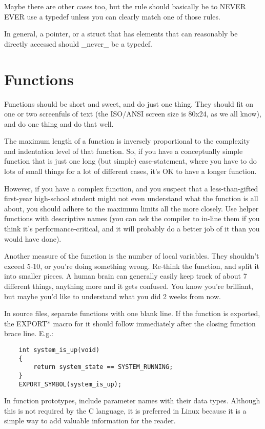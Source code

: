 \documentclass[pdftex,12pt, twocol]{article} %
\begin{document}
Maybe there are other cases too, but the rule should basically be to NEVER
EVER use a typedef unless you can clearly match one of those rules.

In general, a pointer, or a struct that has elements that can reasonably
be directly accessed should \_never\_ be a typedef.


\section{Functions}

Functions should be short and sweet, and do just one thing.  They should
fit on one or two screenfuls of text (the ISO/ANSI screen size is 80x24,
as we all know), and do one thing and do that well.

The maximum length of a function is inversely proportional to the
complexity and indentation level of that function.  So, if you have a
conceptually simple function that is just one long (but simple)
case-statement, where you have to do lots of small things for a lot of
different cases, it's OK to have a longer function.

However, if you have a complex function, and you suspect that a
less-than-gifted first-year high-school student might not even
understand what the function is all about, you should adhere to the
maximum limits all the more closely.  Use helper functions with
descriptive names (you can ask the compiler to in-line them if you think
it's performance-critical, and it will probably do a better job of it
than you would have done).

Another measure of the function is the number of local variables.  They
shouldn't exceed 5-10, or you're doing something wrong.  Re-think the
function, and split it into smaller pieces.  A human brain can
generally easily keep track of about 7 different things, anything more
and it gets confused.  You know you're brilliant, but maybe you'd like
to understand what you did 2 weeks from now.

In source files, separate functions with one blank line.  If the function is
exported, the EXPORT* macro for it should follow immediately after the closing
function brace line.  E.g.:

\begin{verbatim}
	int system_is_up(void)
	{
		return system_state == SYSTEM_RUNNING;
	}
	EXPORT_SYMBOL(system_is_up);
\end{verbatim}

In function prototypes, include parameter names with their data types.
Although this is not required by the C language, it is preferred in Linux
because it is a simple way to add valuable information for the reader.
\end{document}

